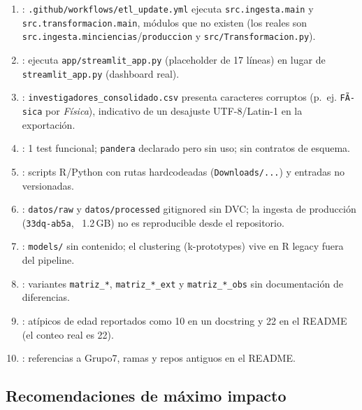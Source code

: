 \begin{enumerate}
  \item {}: \texttt{.github/workflows/etl\_update.yml} ejecuta
        \texttt{src.ingesta.main} y \texttt{src.transformacion.main}, módulos que no
        existen (los reales son \texttt{src.ingesta.minciencias}/\texttt{produccion} y
        \texttt{src/Transformacion.py}).
  \item {}: ejecuta \texttt{app/streamlit\_app.py}
        (placeholder de 17 líneas) en lugar de \texttt{streamlit\_app.py} (dashboard real).
  \item {}: \texttt{investigadores\_consolidado.csv}
        presenta caracteres corruptos (p.~ej. \texttt{FÃ­sica} por \emph{Física}),
        indicativo de un desajuste UTF-8/Latin-1 en la exportación.
  \item {}: 1 test funcional; \texttt{pandera} declarado
        pero sin uso; sin contratos de esquema.
  \item {}: scripts R/Python con rutas hardcodeadas
        (\texttt{Downloads/...}) y entradas no versionadas.
  \item {}: \texttt{datos/raw} y
        \texttt{datos/processed} gitignored sin DVC; la ingesta de producción
        (\texttt{33dq-ab5a}, ~1.2\,GB) no es reproducible desde el repositorio.
  \item {}: \texttt{models/} sin contenido; el clustering
        (k-prototypes) vive en R legacy fuera del pipeline.
  \item {}: variantes \texttt{matriz\_*},
        \texttt{matriz\_*\_ext} y \texttt{matriz\_*\_obs} sin documentación de diferencias.
  \item {}: atípicos de edad reportados como 10 en
        un docstring y 22 en el README (el conteo real es 22).
  \item {}: referencias a Grupo7, ramas y repos
        antiguos en el README.
\end{enumerate}

\subsection{Recomendaciones de máximo impacto}

